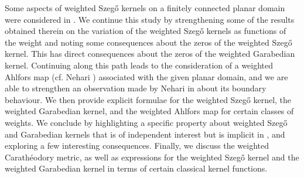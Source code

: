 \documentclass[11pt, reqno]{amsart}
\numberwithin{equation}{section}
\begin{document}
\noindent Some aspects of weighted Szeg\H{o} kernels on a finitely connected planar domain were considered in \cite{JV}. We continue this study by strengthening some of the results obtained therein on the variation of the weighted Szeg\H{o} kernels as functions of the weight and noting some consequences about the zeros of the weighted Szeg\H{o} kernel. This has direct consequences about the zeros of the weighted Garabedian kernel. Continuing along this path leads to the consideration of a weighted Ahlfors map (cf. Nehari \cite{Nehari}) associated with the given planar domain, and we are able to strengthen an observation made by Nehari in \cite{Nehari} about its boundary behaviour. We then provide explicit formulae for the weighted Szeg\H{o} kernel, the weighted Garabedian kernel, and the weighted Ahlfors map for certain classes of weights. We conclude by highlighting a specific property about weighted Szeg\H{o} and Garabedian kernels that is of independent interest but is implicit in \cite{Nehari}, and exploring a few interesting consequences. Finally, we discuss the weighted Carathéodory metric, as well as expressions for the weighted Szeg\H{o} kernel and the weighted Garabedian kernel in terms of certain classical kernel functions.

\medskip
\end{document}

